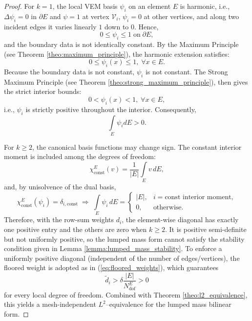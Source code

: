 \documentclass{article}
\newcommand{\integral}[1]{\int \limits_{#1}}
\newcommand{\numdofs}{N^E_{\text{dof}}}
\begin{document}
\begin{proof}
    For $k = 1$, the local VEM basis $\psi_i$ on an element $E$ is harmonic, i.e., $\Delta \psi_i = 0$ in $\partial E$ and $\psi = 1$ at vertex $\mathcal{V}_i$, $\psi_i = 0$ at other vertices, and along two incident edges it varies linearly $1$ down to $0$. Hence,
    \begin{equation}
        \nonumber
        0 \leq \psi_i \leq 1 \; \text{on} \;  \partial E,
    \end{equation}
    and the boundary data is not identically constant. By the Maximum Principle (see Theorem \ref{theo:maximum_principle}), the harmonic extension satisfies:
    \begin{equation}
        \nonumber
        0 \leq \psi_i (x) \leq 1, \; \forall x \in E.
    \end{equation}
    Because the boundary data is not constant, $\psi_i$ is not constant. The Strong Maximum Principle (see Theorem \ref{theo:strong_maximum_principle}), then gives the strict interior bounds:
    \begin{equation}
        \nonumber
        0 < \psi_i (x) < 1, \; \forall x \in E,
    \end{equation}
    i.e., $\psi_i$ is strictly positive throughout the interior. Consequently,
    \begin{equation}
        \nonumber
        \int \limits_E \psi_i dE > 0.
    \end{equation}

    For $k \geq 2$, the canonical basis functions may change sign. The constant interior moment is included among the degrees of freedom:
    \begin{equation}
        \nonumber
        \chi^E_{\text{const}}(v) = \frac{1}{|E|} \int \limits_E v \, dE,
    \end{equation}
    and, by unisolvence of the dual basis,
    \begin{equation}
        \nonumber
        \chi^E_{\text{const}}(\psi_i) = \delta_{i,\text{const}}
        \;\Rightarrow\;
        \integral{E} \psi_i \, dE =
        \begin{cases}
            |E|, & i = \text{const interior moment}, \\
            0,   & \text{otherwise}.
        \end{cases}
    \end{equation}
    Therefore, with the row-sum weights $d_i$, the element-wise diagonal has exactly one positive entry and the others are zero when $k \geq 2$. It is positive semi-definite but not uniformly positive, so the lumped mass form cannot satisfy the stability condition given in Lemma \ref{lemma:lumped_mass_stability}. To enforce a uniformly positive diagonal (independent of the number of edges/vertices), the floored weight is adopted as in (\ref{eq:floored_weights}), which guarantees
    \begin{equation}
        \nonumber
        \tilde{d}_i > \delta \frac{|E|}{\numdofs} > 0
    \end{equation}
    for every local degree of freedom. Combined with Theorem \ref{theo:l2_equivalence}, this yields a mesh-independent $L^2$--equivalence for the lumped mass bilinear form. 


\end{proof}
\end{document}
